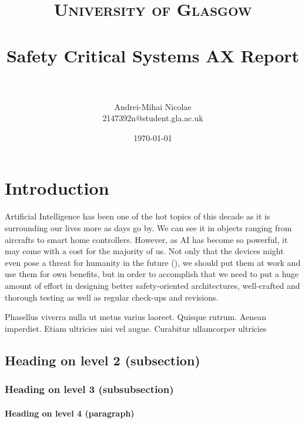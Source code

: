 \documentclass[paper=a4, fontsize=11pt]{scrartcl} %
\title{
\normalfont \normalsize
\textsc{University of Glasgow} \\ [25pt] 
\horrule{0.5pt} \\[0.4cm] %
\huge Safety Critical Systems AX Report \\ 
\horrule{2pt} \\[0.5cm] %
}
\author{Andrei-Mihai Nicolae\\2147392n@student.gla.ac.uk} %
\date{\normalsize\today} %
\numberwithin{equation}{section} %
\numberwithin{figure}{section} %
\numberwithin{table}{section} %
\begin{document}
\maketitle %

\tableofcontents %


\section{Introduction}

Artificial Intelligence has been one of the hot topics of this decade as it is surrounding our lives more as days go
by. We can see it in objects ranging from aircrafts to smart home controllers. However, as AI has become so powerful, it
may come with a cost for the majority of us. Not only that the devices might even pose a threat for humanity in the future (\cite{ai-risks}), we should put them at work and use them for own benefits, but in order to accomplish that we need to put a huge amount of effort in designing better safety-oriented architectures, well-crafted and thorough testing as well as regular check-ups and revisions.


Phasellus viverra nulla ut metus varius laoreet. Quisque rutrum. Aenean imperdiet. Etiam ultricies nisi vel augue. Curabitur ullamcorper ultricies




\subsection{Heading on level 2 (subsection)}



\subsubsection{Heading on level 3 (subsubsection)}

\lipsum[3] %

\paragraph{Heading on level 4 (paragraph)}
\end{document}
